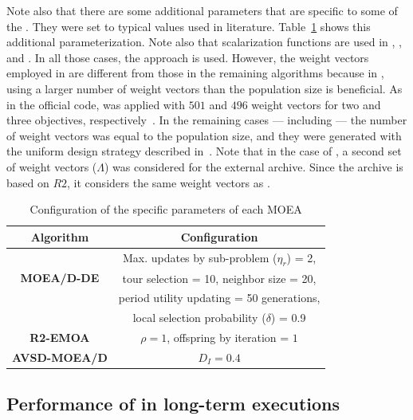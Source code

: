 Note also that there are some additional parameters that are specific to some of the \MOEAS{}.
%
They were set to typical values used in literature. 
%
Table~\ref{tab:Parametrization} shows this additional parameterization.
%
Note also that scalarization functions are used in \MOEADDE{}, \RMOEA{}, \NSGAIII{} and \AVSDMOEAD{}.
%
In all those cases, the \ASF{} approach is used.
%
However, the weight vectors employed in \RMOEA{} are different from those in the remaining algorithms because in \RMOEA{}, using
a larger number of weight vectors than the population size is beneficial.
%
As in the official code, \RMOEA{} was applied with $501$ and $496$ weight vectors for two and three objectives, 
respectively~\cite{trautmann2013r2}.
%
In the remaining cases --- including \AVSDMOEAD{} --- the number of weight vectors was equal to the population size, and they were generated
with the uniform design strategy described in~\cite{wagner:13}.
%
Note that in the case of \AVSDMOEAD{}, a second set of weight vectors ($\Lambda$) was considered for the external archive.
%
Since the archive is based on $R2$, it considers the same weight vectors as \RMOEA{}.

\begin{table}[t]
\centering
\caption{Configuration of the specific parameters of each MOEA}
\label{tab:Parametrization}
\begin{scriptsize}
\begin{tabular}{|c|c|}
\hline
\textbf{Algorithm} & \textbf{Configuration} \\ \hline
\multirow{3}{*}{
\textbf{MOEA/D-DE}} & Max. updates by sub-problem ($\eta_r$) = 2, \\
 & tour selection = 10,   neighbor size = 20, \\
 & period utility updating = 50 generations, \\
 & local selection probability ($\delta$) = 0.9\\ \hline
\textbf{R2-EMOA} & $\rho=1$, offspring by iteration = $1$ \\ \hline
\textbf{AVSD-MOEA/D} & $D_I=0.4$ \\ \hline
\end{tabular}
\end{scriptsize}
\end{table}





\subsection{Performance of \MOEAS{} in long-term executions}

